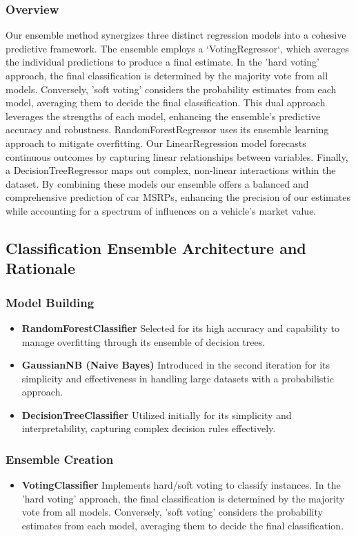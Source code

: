 \documentclass{article}
\begin{document}
\subsubsection{Overview}
Our ensemble method synergizes three distinct regression models into a cohesive predictive framework. The ensemble employs a `VotingRegressor`, which averages the individual predictions to produce a final estimate. In the 'hard voting' approach, the final classification is determined by the majority vote from all models. Conversely, 'soft voting' considers the probability estimates from each model, averaging them to decide the final classification. This dual approach leverages the strengths of each model, enhancing the ensemble's predictive accuracy and robustness. 
\newline
\newline 
RandomForestRegressor uses its ensemble learning approach to mitigate overfitting. Our LinearRegression model forecasts continuous outcomes by capturing linear relationships between variables. Finally, a DecisionTreeRegressor maps out complex, non-linear interactions within the dataset. By combining these models our ensemble offers a balanced and comprehensive prediction of car MSRPs, enhancing the precision of our estimates while accounting for a spectrum of influences on a vehicle's market value.

\subsection{Classification Ensemble Architecture and Rationale}
\subsubsection{Model Building}
\begin{itemize}
    \item \textbf{RandomForestClassifier} Selected for its high accuracy and capability to manage overfitting through its ensemble of decision trees.
    \item \textbf{GaussianNB (Naive Bayes)} Introduced in the second iteration for its simplicity and effectiveness in handling large datasets with a probabilistic approach.
    \item \textbf{DecisionTreeClassifier} Utilized initially for its simplicity and interpretability, capturing complex decision rules effectively.
\end{itemize}
\subsubsection{Ensemble Creation}
\begin{itemize}
    \item \textbf{VotingClassifier} Implements hard/soft voting to classify instances. In the 'hard voting' approach, the final classification is determined by the majority vote from all models. Conversely, 'soft voting' considers the probability estimates from each model, averaging them to decide the final classification.
\end{itemize}
\end{document}
